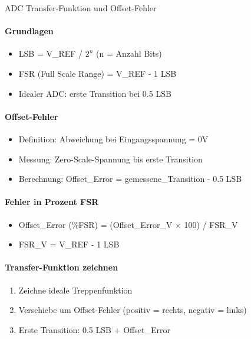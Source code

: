 \begin{KR}{ADC Transfer-Funktion und Offset-Fehler}\\
    \paragraph{Grundlagen}
    \begin{itemize}
        \item LSB = V\_REF / $2^n$ (n = Anzahl Bits)
        \item FSR (Full Scale Range) = V\_REF - 1 LSB
        \item Idealer ADC: erste Transition bei 0.5 LSB
    \end{itemize}
    
    \paragraph{Offset-Fehler}
    \begin{itemize}
        \item Definition: Abweichung bei Eingangsspannung = 0V
        \item Messung: Zero-Scale-Spannung bis erste Transition
        \item Berechnung: Offset\_Error = gemessene\_Transition - 0.5 LSB
    \end{itemize}
    
    \paragraph{Fehler in Prozent FSR}
    \begin{itemize}
        \item Offset\_Error (\%FSR) = (Offset\_Error\_V $\times$ 100) / FSR\_V
        \item FSR\_V = V\_REF - 1 LSB
    \end{itemize}
    
    \paragraph{Transfer-Funktion zeichnen}
    \begin{enumerate}
        \item Zeichne ideale Treppenfunktion
        \item Verschiebe um Offset-Fehler (positiv = rechts, negativ = links)
        \item Erste Transition: 0.5 LSB + Offset\_Error
    \end{enumerate}
\end{KR}


